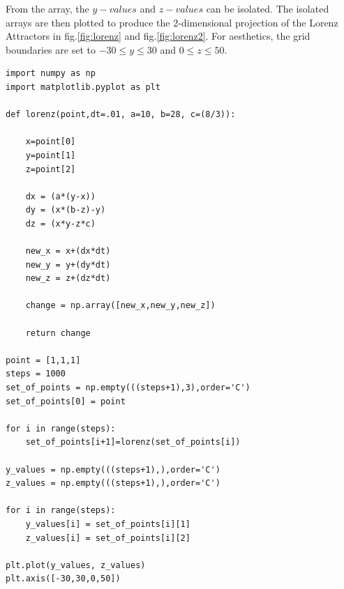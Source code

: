 \documentclass{article}
\newenvironment{code}{\captionsetup{type=listing}}{}
\begin{document}
From the array, the $y-values$ and $z-values$ can be isolated.  The isolated arrays are then plotted to produce the 2-dimensional projection of the Lorenz Attractors in fig.\ref{fig:lorenz} and fig.\ref{fig:lorenz2}.  For aesthetics, the grid boundaries are set to $-30\leq y\leq 30$ and $0\leq z\leq 50$.

\newpage
\begin{code}
\label{code:python-code}
\begin{verbatim}
import numpy as np
import matplotlib.pyplot as plt
        
def lorenz(point,dt=.01, a=10, b=28, c=(8/3)):
    
    x=point[0]
    y=point[1]
    z=point[2]

    dx = (a*(y-x))
    dy = (x*(b-z)-y)
    dz = (x*y-z*c)
    
    new_x = x+(dx*dt)
    new_y = y+(dy*dt)
    new_z = z+(dz*dt)
    
    change = np.array([new_x,new_y,new_z])
    
    return change

point = [1,1,1]
steps = 1000
set_of_points = np.empty(((steps+1),3),order='C')
set_of_points[0] = point

for i in range(steps):
    set_of_points[i+1]=lorenz(set_of_points[i])
    
y_values = np.empty(((steps+1),),order='C')
z_values = np.empty(((steps+1),),order='C')

for i in range(steps):
    y_values[i] = set_of_points[i][1]
    z_values[i] = set_of_points[i][2]

plt.plot(y_values, z_values)
plt.axis([-30,30,0,50])
\end{verbatim}
\end{code}

\newpage


\end{document}
